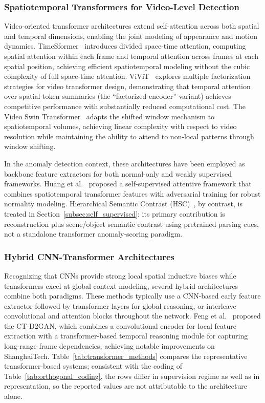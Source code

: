 \documentclass[10pt,a4paper]{article}
\begin{document}
\subsubsection{Spatiotemporal Transformers for Video-Level Detection}

Video-oriented transformer architectures extend self-attention across both spatial and temporal dimensions, enabling the joint modeling of appearance and motion dynamics. TimeSformer~\citep{bertasius2021space} introduces divided space-time attention, computing spatial attention within each frame and temporal attention across frames at each spatial position, achieving efficient spatiotemporal modeling without the cubic complexity of full space-time attention. ViViT~\citep{arnab2021vivit} explores multiple factorization strategies for video transformer design, demonstrating that temporal attention over spatial token summaries (the ``factorized encoder'' variant) achieves competitive performance with substantially reduced computational cost. The Video Swin Transformer~\citep{liu2022video} adapts the shifted window mechanism to spatiotemporal volumes, achieving linear complexity with respect to video resolution while maintaining the ability to attend to non-local patterns through window shifting.

In the anomaly detection context, these architectures have been employed as backbone feature extractors for both normal-only and weakly supervised frameworks. Huang et al.~\citeyearpar{huang2022self} proposed a self-supervised attentive framework that combines spatiotemporal transformer features with adversarial training for robust normality modeling. Hierarchical Semantic Contrast (HSC)~\citep{sun2023hierarchical}, by contrast, is treated in Section~\ref{subsec:self_supervised}: its primary contribution is reconstruction plus scene/object semantic contrast using pretrained parsing cues, not a standalone transformer anomaly-scoring paradigm.

\subsubsection{Hybrid CNN-Transformer Architectures}

Recognizing that CNNs provide strong local spatial inductive biases while transformers excel at global context modeling, several hybrid architectures combine both paradigms. These methods typically use a CNN-based early feature extractor followed by transformer layers for global reasoning, or interleave convolutional and attention blocks throughout the network. Feng et al.~\citeyearpar{feng2021ct} proposed the CT-D2GAN, which combines a convolutional encoder for local feature extraction with a transformer-based temporal reasoning module for capturing long-range frame dependencies, achieving notable improvements on ShanghaiTech. Table~\ref{tab:transformer_methods} compares the representative transformer-based systems; consistent with the coding of Table~\ref{tab:orthogonal_coding}, the rows differ in supervision regime as well as in representation, so the reported values are not attributable to the architecture alone.
\end{document}
